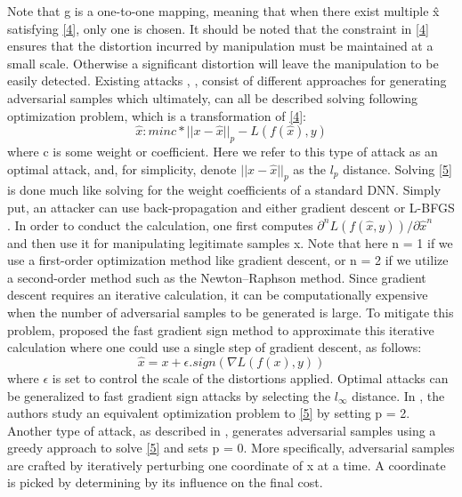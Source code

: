 \documentclass{article}
\begin{document}
	Note that g is a one-to-one mapping, meaning that when there exist multiple x̂ satisfying \eqref{4}, only one is chosen. It should be noted that the constraint in \eqref{4} ensures that the distortion incurred by manipulation must be maintained at a small scale. Otherwise a significant distortion will leave the manipulation to be easily detected. Existing attacks \cite{carlini2017towards}, \cite{szegedy2013intriguing}, \cite{papernot2016limitations} consist of different approaches for generating adversarial samples which ultimately, can all be described solving following optimization problem, which is a transformation of \eqref{4}:
	\begin{equation}\label{5}
		\hat{x}: min c*||x - \hat{x}||_p - L(f(\hat{x}), y)
	\end{equation} 
	where c is some weight or coefficient. Here we refer to this type of attack as an optimal attack, and, for simplicity, denote $||x − \hat{x}||_p$ as the $l_p$ distance.
	Solving \eqref{5} is done much like solving for the weight coefficients of a standard DNN. Simply put, an attacker can use back-propagation and either gradient descent \cite{szegedy2013intriguing} or L-BFGS \cite{carlini2017towards}. In order to conduct the calculation, one first computes 
	$\partial^n L(f(\hat{x}, y)) / \partial \hat{x}^n$ and then use it for manipulating legitimate samples x. Note that here n = 1 if we use a first-order optimization method like gradient descent, or n = 2 if we utilize a second-order method such as the Newton–Raphson method. Since gradient descent requires an iterative calculation, it can be computationally expensive when the number of adversarial samples to be generated is large. To mitigate this problem, \cite{szegedy2013intriguing} proposed the fast gradient sign method to approximate this iterative calculation where
	one could use a single step of gradient descent, as follows:
	\begin{equation}
		\hat{x} = x + \epsilon . sign(\nabla L(f(x), y))
	\end{equation}
	where $\epsilon$ is set to control the scale of the distortions applied. Optimal attacks can be generalized to fast gradient sign attacks by selecting the $l_\infty$ distance. In \cite{szegedy2013intriguing}, the authors study an equivalent optimization problem to \eqref{5} by setting p = 2. Another type of attack, as described in \cite{papernot2016limitations}, generates adversarial samples using a greedy approach to solve \eqref{5} and sets p = 0. More specifically, adversarial samples are crafted by iteratively perturbing one coordinate of x at a time. A coordinate is picked by determining by its influence on the final cost.
	
\end{document}
